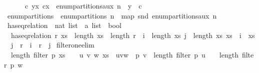 \begin{isabellebody}
\ \ \ \ \ \ {\isacharbrackleft}{\kern0pt}{\isacharparenleft}{\kern0pt}c{\isacharcomma}{\kern0pt}\ y{\isacharhash}{\kern0pt}x{\isacharparenright}{\kern0pt}{\isachardot}{\kern0pt}\ {\isacharparenleft}{\kern0pt}c{\isacharcomma}{\kern0pt}x{\isacharparenright}{\kern0pt}\ {\isasymleftarrow}\ enum{\isacharunderscore}{\kern0pt}partitions{\isacharunderscore}{\kern0pt}aux\ n{\isacharcomma}{\kern0pt}\ \ y\ {\isasymleftarrow}\ {\isacharbrackleft}{\kern0pt}{}{\isachardot}{\kern0pt}{\isachardot}{\kern0pt}{\isacharless}{\kern0pt}c{\isacharbrackright}{\kern0pt}{\isacharbrackright}{\kern0pt}{\isachardoublequoteclose}\isanewline
\isanewline
{}\isamarkupfalse%
\ enum{\isacharunderscore}{\kern0pt}partitions\ \ {\isachardoublequoteopen}enum{\isacharunderscore}{\kern0pt}partitions\ n\ {\isacharequal}{\kern0pt}\ map\ snd\ {\isacharparenleft}{\kern0pt}enum{\isacharunderscore}{\kern0pt}partitions{\isacharunderscore}{\kern0pt}aux\ n{\isacharparenright}{\kern0pt}{\isachardoublequoteclose}\isanewline
\isanewline
{}\isamarkupfalse%
\ has{\isacharunderscore}{\kern0pt}eq{\isacharunderscore}{\kern0pt}relation\ {\isacharcolon}{\kern0pt}{\isacharcolon}{\kern0pt}\ {\isachardoublequoteopen}nat\ list\ {\isasymRightarrow}\ {\isacharprime}{\kern0pt}a\ list\ {\isasymRightarrow}\ bool{\isachardoublequoteclose}\ \ \isanewline
\ \ {\isachardoublequoteopen}has{\isacharunderscore}{\kern0pt}eq{\isacharunderscore}{\kern0pt}relation\ r\ xs\ {\isacharequal}{\kern0pt}\ {\isacharparenleft}{\kern0pt}length\ xs\ {\isacharequal}{\kern0pt}\ length\ r\ {\isasymand}\ {\isacharparenleft}{\kern0pt}{\isasymforall}i\ {\isacharless}{\kern0pt}\ length\ xs{\isachardot}{\kern0pt}\ {\isasymforall}j\ {\isacharless}{\kern0pt}\ length\ xs{\isachardot}{\kern0pt}\ {\isacharparenleft}{\kern0pt}xs\ {\isacharbang}{\kern0pt}\ i\ {\isacharequal}{\kern0pt}\ xs\ {\isacharbang}{\kern0pt}\ j{\isacharparenright}{\kern0pt}\ {\isacharequal}{\kern0pt}\ {\isacharparenleft}{\kern0pt}r\ {\isacharbang}{\kern0pt}\ i\ {\isacharequal}{\kern0pt}\ r\ {\isacharbang}{\kern0pt}\ j{\isacharparenright}{\kern0pt}{\isacharparenright}{\kern0pt}{\isacharparenright}{\kern0pt}{\isachardoublequoteclose}\isanewline
\isanewline
{}\isamarkupfalse%
\ filter{\isacharunderscore}{\kern0pt}one{\isacharunderscore}{\kern0pt}elim{\isacharcolon}{\kern0pt}\isanewline
\ \ {\isachardoublequoteopen}length\ {\isacharparenleft}{\kern0pt}filter\ p\ xs{\isacharparenright}{\kern0pt}\ {\isacharequal}{\kern0pt}\ {}\ {\isasymLongrightarrow}\ {\isacharparenleft}{\kern0pt}{\isasymexists}u\ v\ w{\isachardot}{\kern0pt}\ xs\ {\isacharequal}{\kern0pt}\ u{\isacharat}{\kern0pt}v{\isacharhash}{\kern0pt}w\ {\isasymand}\ p\ v\ {\isasymand}\ length\ {\isacharparenleft}{\kern0pt}filter\ p\ u{\isacharparenright}{\kern0pt}\ {\isacharequal}{\kern0pt}\ {}\ {\isasymand}\ length\ {\isacharparenleft}{\kern0pt}filter\ p\ w{\isacharparenright}{\kern0pt}\ {\isacharequal}{\kern0pt}\ {}{\isacharparenright}{\kern0pt}{\isachardoublequoteclose}\isanewline

\end{isabellebody}
